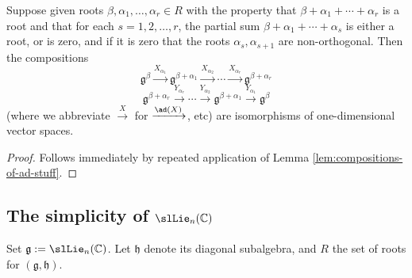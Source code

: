 \documentclass[reqno]{amsart} 
\begin{document}
\begin{lemma}\label{lem:condition-for-chain-of-root-maps-not-to-vanish}
  Suppose given roots $\beta, \alpha_1, \dotsc, \alpha_r \in R$ with the property that $\beta + \alpha_1 + \dotsb + \alpha_r$ is a root and that for each $s = 1,2,\dotsc,r$, the partial sum $\beta + \alpha_1 + \dotsb + \alpha_s$ is either a root, or is zero, and if it is zero that the roots $\alpha_s, \alpha_{s+1}$ are non-orthogonal.  Then the compositions
  \begin{equation*}
    \mathfrak{g}^\beta \xrightarrow{X_{\alpha_1}} \mathfrak{g}^{\beta+\alpha_1} \xrightarrow{X_{\alpha_2}} \dotsb \xrightarrow{X_{\alpha_{r}}} \mathfrak{g}^{\beta+\alpha_r}
  \end{equation*}
  \begin{equation*}
    \mathfrak{g}^{\beta+\alpha_r} \xrightarrow{Y_{\alpha_r}} \dotsb \xrightarrow{Y_{\alpha_2}} \mathfrak{g}^{\beta+\alpha_1} \xrightarrow{Y_{\alpha_{1}}} \mathfrak{g}^{\beta}
  \end{equation*}
  (where we abbreviate $\xrightarrow{X}$ for $\xrightarrow{\ad(X)}$, etc) are isomorphisms of one-dimensional vector spaces.
\end{lemma}
\begin{proof}
  Follows immediately by repeated application of Lemma \ref{lem:compositions-of-ad-stuff}.
\end{proof}

\subsection{The simplicity of \(\slLie_n(\mathbb{C})\)}
\label{sec:org952f7d3}
Set $\mathfrak{g} := \slLie_n(\mathbb{C})$.  Let $\mathfrak{h}$ denote its diagonal subalgebra, and $R$ the set of roots for $(\mathfrak{g},\mathfrak{h})$.
\end{document}
